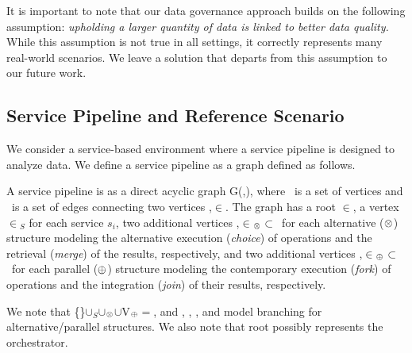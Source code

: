 It is important to note that our data governance approach builds on the following assumption: \emph{upholding a larger quantity of data is linked to better data quality.} While this assumption is not true in all settings, it correctly represents many real-world scenarios. We leave a solution that departs from this assumption to our future work.

\subsection{Service Pipeline and Reference Scenario}\label{sec:service_definition}
We consider a service-based environment where a service pipeline is designed to analyze
data. We define a service pipeline as a graph defined as follows. %
\begin{definition} \label{def:service_flow}
  A service pipeline is as a direct acyclic graph G(\V,\E), where \V\ is a set of vertices and \E\ is a set of edges connecting two vertices ,$\in$\V. The graph has a root $\in$\V, a vertex $\in$\V$_S$ for each service $s_i$, two additional vertices ,$\in$\V$_{\otimes}$$\subset$\V\ for each alternative ($\otimes$) structure modeling the alternative execution (\emph{choice}) of operations and the retrieval (\emph{merge}) of the results, respectively, and two additional vertices ,$\in$\V$_{\oplus}$$\subset$\V\ for each parallel ($\oplus$) structure modeling the contemporary execution (\emph{fork}) of operations and the integration (\emph{join}) of their results, respectively.
\end{definition}

We note that \{\}$\cup$\V$_S$$\cup$\V$_{\otimes}$$\cup$V$_{\oplus}$$=$\V, and , , , and  model branching for alternative/parallel structures. We also note that root  possibly represents the orchestrator.

